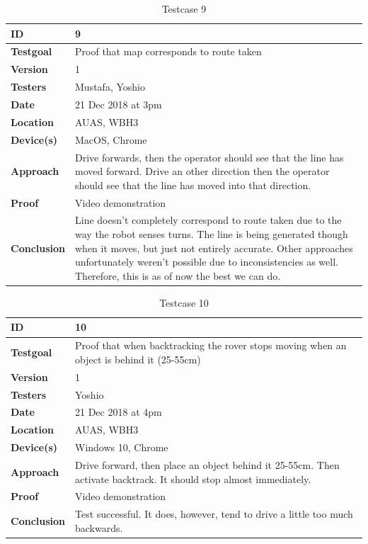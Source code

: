\documentclass[12pt]{article}
\begin{document}
	\begin{table}[H]
		\centering
		\begin{tabularx}{\linewidth}{|X|X|}
			\hline
			\textbf{ID} &9\\
			\hline
			\textbf{Testgoal} &Proof that map corresponds to route taken\\
			\hline
			\textbf{Version} &1\\
			\hline
			\textbf{Testers} &Mustafa, Yoshio\\
			\hline
			\textbf{Date} &21 Dec 2018 at 3pm\\
			\hline
			\textbf{Location} &AUAS, WBH3\\
			\hline
			\textbf{Device(s)} &MacOS, Chrome\\
			\hline
			\textbf{Approach} &Drive forwards, then the operator should see that the line has moved forward. Drive an other direction then the operator should see that the line has moved into that direction.\\
			\hline
			\textbf{Proof} &Video demonstration\\
			\hline
			\textbf{Conclusion} &Line doesn't completely correspond to route taken due to the way the robot senses turns. The line is being generated though when it moves, but just not entirely accurate. Other approaches unfortunately weren't possible due to inconsistencies as well. Therefore, this is as of now the best we can do.\\
			\hline
		\end{tabularx}
		\caption{Testcase 9}
		\label{table:Testcase 9}   
	\end{table}
	\begin{table}[H]
		\centering
		\begin{tabularx}{\linewidth}{|X|X|}
			\hline
			\textbf{ID} &10\\
			\hline
			\textbf{Testgoal} &Proof that when backtracking the rover stops moving when an object is behind it (25-55cm)\\
			\hline
			\textbf{Version} &1\\
			\hline
			\textbf{Testers} &Yoshio\\
			\hline
			\textbf{Date} &21 Dec 2018 at 4pm\\
			\hline
			\textbf{Location} &AUAS, WBH3\\
			\hline
			\textbf{Device(s)} &Windows 10, Chrome\\
			\hline
			\textbf{Approach} &Drive forward, then place an object behind it 25-55cm. Then activate backtrack. It should stop almost immediately.\\
			\hline
			\textbf{Proof} &Video demonstration\\
			\hline
			\textbf{Conclusion} &Test successful. It does, however, tend to drive a little too much backwards.\\
			\hline
		\end{tabularx}
		\caption{Testcase 10}
		\label{table:Testcase 10}   
	\end{table}
\end{document}
